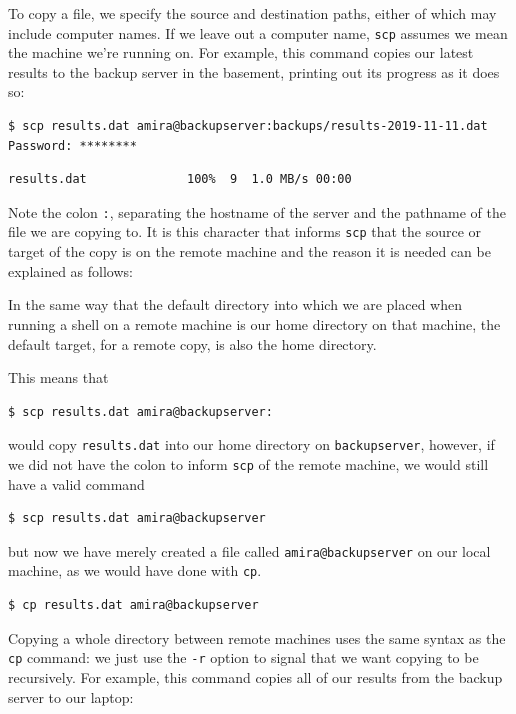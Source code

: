 \documentclass[
]{krantz}
\begin{document}
To copy a file,
we specify the source and destination paths,
either of which may include computer names.
If we leave out a computer name,
\texttt{scp} assumes we mean the machine we're running on.
For example,
this command copies our latest results to the backup server in the basement,
printing out its progress as it does so:

\begin{verbatim}
$ scp results.dat amira@backupserver:backups/results-2019-11-11.dat
Password: ********
\end{verbatim}

\begin{verbatim}
results.dat              100%  9  1.0 MB/s 00:00
\end{verbatim}

Note the colon \texttt{:}, separating the hostname of the server and the pathname of
the file we are copying to.
It is this character that informs \texttt{scp} that the source or target of the copy is
on the remote machine and the reason it is needed can be explained as follows:

In the same way that the default directory into which we are placed when running
a shell on a remote machine is our home directory on that machine, the default
target, for a remote copy, is also the home directory.

This means that

\begin{verbatim}
$ scp results.dat amira@backupserver:
\end{verbatim}

would copy \texttt{results.dat} into our home directory on \texttt{backupserver}, however, if we did not
have the colon to inform \texttt{scp} of the remote machine, we would still have a valid command

\begin{verbatim}
$ scp results.dat amira@backupserver
\end{verbatim}

but now we have merely created a file called \texttt{amira@backupserver} on our local machine,
as we would have done with \texttt{cp}.

\begin{verbatim}
$ cp results.dat amira@backupserver
\end{verbatim}

Copying a whole directory between remote machines uses the same syntax as the \texttt{cp} command:
we just use the \texttt{-r} option to signal that we want copying to be recursively.
For example,
this command copies all of our results from the backup server to our laptop:
\end{document}
